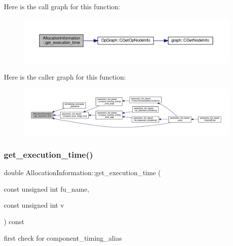 Here is the call graph for this function\+:
\nopagebreak
\begin{figure}[H]
\begin{center}
\leavevmode
\includegraphics[width=350pt]{d7/d79/classAllocationInformation_a179bb372b147744dc250c8d310f3e1e8_cgraph}
\end{center}
\end{figure}
Here is the caller graph for this function\+:
\nopagebreak
\begin{figure}[H]
\begin{center}
\leavevmode
\includegraphics[width=350pt]{d7/d79/classAllocationInformation_a179bb372b147744dc250c8d310f3e1e8_icgraph}
\end{center}
\end{figure}
\mbox{\label{classAllocationInformation_aa0baee2e03b9245d2ec159e64fd5b926}} 
\subsubsection{\texorpdfstring{get\+\_\+execution\+\_\+time()}{get\_execution\_time()}\hspace{0.1cm}{\footnotesize\ttfamily [2/2]}}
{\footnotesize\ttfamily double Allocation\+Information\+::get\+\_\+execution\+\_\+time (\begin{DoxyParamCaption}\item[{const unsigned int}]{fu\+\_\+name,  }\item[{const unsigned int}]{v }\end{DoxyParamCaption}) const}

first check for component\+\_\+timing\+\_\+alias

